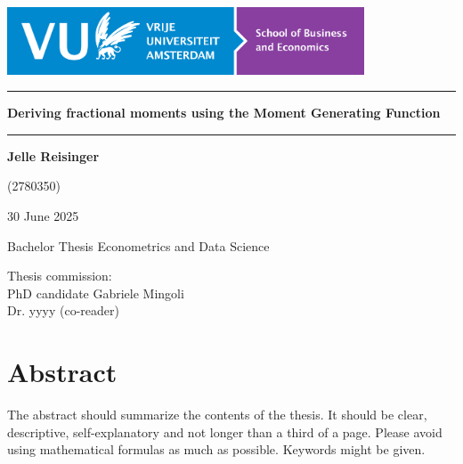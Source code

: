 \documentclass[a4paper,11pt]{article}
\theoremstyle{plain}
\numberwithin{theorem}{subsection}
\numberwithin{corollary}{subsection}
\numberwithin{proposition}{subsection}
\numberwithin{lemma}{subsection}
\numberwithin{assumption}{subsection}
\theoremstyle{definition}
\numberwithin{definition}{subsection}
\numberwithin{example}{subsection}
\numberwithin{remark}{subsection}
\numberwithin{notation}{subsection}
\begin{document}

\thispagestyle{empty}

\includegraphics[height=2cm]{figures/LogoSBE.png}

\vspace*{3cm}

\noindent
\rule{\textwidth}{0.8pt}
\begin{center}
{\huge\bf
\noindent
Deriving fractional moments using the Moment Generating Function
}
\end{center}

\vspace*{-8pt}
\noindent
\rule{\textwidth}{0.8pt}

\vspace*{2cm}

\begin{center}
{\LARGE\bf
Jelle Reisinger
}

{\Large
\vspace*{0.5cm}
(2780350)


\vspace*{2cm}

30 June 2025
}
\end{center}

\vspace*{2cm}

{\Large
\noindent
Bachelor Thesis Econometrics and Data Science
}

\vspace*{1cm}

{\Large
\noindent
Thesis commission:\\[0.3cm]
PhD candidate Gabriele Mingoli\\[0.3cm]
Dr. yyyy (co-reader)
}


\newpage

\setcounter{page}{1}

\section*{Abstract}
The abstract should summarize the contents of the thesis.
It should be clear, descriptive, self-explanatory and not longer
than a third of a page. Please avoid using mathematical
formulas as much as possible.
Keywords might be given.
\end{document}
